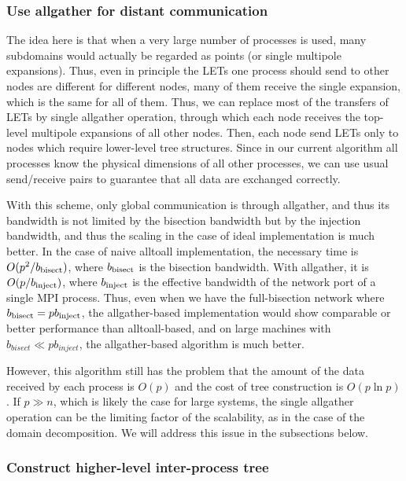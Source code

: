 \subsubsection{Use allgather for distant communication}
\label{sect:allgatherlet}
The idea here is that when a very large number of processes is used,
many subdomains would actually be regarded as points (or single
multipole expansions). Thus, even in principle the LETs one process
should send to other nodes are different for different nodes, many of
them receive the single expansion, which is the same for all of
them. Thus, we can replace most of the transfers of LETs by single
allgather operation, through which each node receives the top-level
multipole expansions of all other nodes. Then, each node send LETs
only to nodes which require lower-level tree structures. Since in our
current algorithm all processes know the physical dimensions of all
other processes, we can use usual send/receive pairs to guarantee that
all data are exchanged correctly.

With this scheme, only global communication is through allgather, and
thus its bandwidth is not limited by the bisection bandwidth but by
the injection bandwidth, and thus the scaling in the case of ideal
implementation is much better. In the case of naive alltoall
implementation, the necessary time is $O(p^2/b_{\rm bisect})$, where
$b_{\rm bisect}$ is the bisection bandwidth. With allgather,
it is $O(p/b_{\rm inject})$, where $b_{\rm inject}$ is the effective bandwidth of the
network port of a single MPI process. Thus, even when we have the
full-bisection network where $ b_{\rm bisect} = pb_{\rm inject}$,
the allgather-based implementation would show comparable or better
performance than alltoall-based, and on large machines with
$ b_{bisect} \ll pb_{inject}$, the allgather-based algorithm is much
better.

However, this algorithm still has the problem that the amount of the
data received by each process is $O(p)$ and the cost of tree
construction is  $O(p \ln p)$. If $p\gg n$, which is likely the case
for large systems, the single allgather operation can be the limiting
factor of the scalability, as in the case of the domain decomposition.
We will address this issue in the subsections below.


\subsubsection{Construct higher-level inter-process tree}

